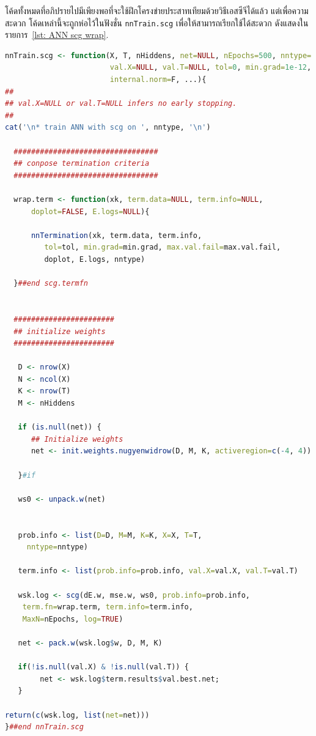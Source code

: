 โค้ดทั้งหมดที่อภิปรายไปมีเพียงพอที่จะใช้ฝึกโครงข่ายประสาทเทียมด้วยวิธีเอสซีจีได้แล้ว 
แต่เพื่อความสะดวก โค้ดเหล่านี้จะถูกห่อไว้ในฟังชั่น \texttt{nnTrain.scg} เพื่อให้สามารถเรียกใช้ได้สะดวก 
ดังแสดงในรายการ~\ref{lst: ANN scg wrap}.

\begin{lstlisting}[language=R,caption={โค้ดฟังชั่น \texttt{nnTrain.scg} ซึ่งห่อรายละเอียดการฝึกโครงข่ายประสาทเทียมด้วยวิธีเอสซีจีเอาไว้เพื่อความสะดวกในการใช้งาน},
label={lst: ANN scg wrap}]
nnTrain.scg <- function(X, T, nHiddens, net=NULL, nEpochs=500, nntype='regression', 
                        val.X=NULL, val.T=NULL, tol=0, min.grad=1e-12, max.val.fail=8, 
                        internal.norm=F, ...){
##
## val.X=NULL or val.T=NULL infers no early stopping.
##
cat('\n* train ANN with scg on ', nntype, '\n')

  #################################
  ## conpose termination criteria
  #################################

  wrap.term <- function(xk, term.data=NULL, term.info=NULL,
      doplot=FALSE, E.logs=NULL){

      nnTermination(xk, term.data, term.info,
         tol=tol, min.grad=min.grad, max.val.fail=max.val.fail,
         doplot, E.logs, nntype)

  }##end scg.termfn


  #######################
  ## initialize weights
  #######################

   D <- nrow(X)
   N <- ncol(X)
   K <- nrow(T)
   M <- nHiddens

   if (is.null(net)) {
      ## Initialize weights
      net <- init.weights.nugyenwidrow(D, M, K, activeregion=c(-4, 4))

   }#if
      
   ws0 <- unpack.w(net)


   prob.info <- list(D=D, M=M, K=K, X=X, T=T,
     nntype=nntype)

   term.info <- list(prob.info=prob.info, val.X=val.X, val.T=val.T)

   wsk.log <- scg(dE.w, mse.w, ws0, prob.info=prob.info, 
    term.fn=wrap.term, term.info=term.info, 
    MaxN=nEpochs, log=TRUE)

   net <- pack.w(wsk.log$w, D, M, K)

   if(!is.null(val.X) & !is.null(val.T)) {
        net <- wsk.log$term.results$val.best.net;
   }
   
return(c(wsk.log, list(net=net)))
}##end nnTrain.scg
\end{lstlisting}

